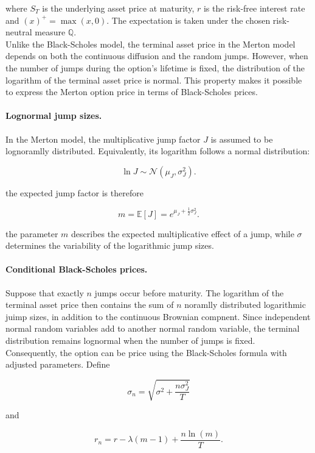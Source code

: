 \documentclass{article}
\begin{document}
	where $S_T$ is the underlying asset price at maturity, $r$ is the risk-free interest rate and $(x)^+ = \max(x, 0)$. The expectation is taken under the chosen risk-neutral measure $\mathbb{Q}$.\\
	Unlike the Black-Scholes model, the terminal asset price in the Merton model depends on both the continuous diffusion and the random jumps. However, when the number of jumps during the option's lifetime is fixed, the distribution of the logarithm of the terminal asset price is normal. This property makes it possible to express the Merton option price in terms of Black-Scholes prices. 
	
	\paragraph{Lognormal jump sizes.}
	
	In the Merton model, the multiplicative jump factor $J$ is assumed to be lognoramlly distributed. Equivalently, its logarithm follows a normal distribution:
	
	\[
	\ln J \sim
	\mathcal{N}(\mu_J,\sigma_J^2).
	\]
	
	the expected jump factor is therefore
	
	\[
	m=\mathbb{E}[J]
	=e^{\mu_J+\frac{1}{2}\sigma_J^2}.
	\]
	
	the parameter $m$ describes the expected multiplicative effect of a jump, while $\sigma$ determines the variability of the logarithmic jump sizes.
	
	\paragraph{Conditional Black-Scholes prices.}
	
	Suppose that exactly $n$ jumps occur before maturity. The logarithm of the terminal asset price then contains the sum of $n$ noramlly distributed logarithmic juimp sizes, in addition to the continuous Brownian compnent. Since independent normal random variables add to another normal random variable, the terminal distribution remains lognormal when the number of jumps is fixed.\\
	Consequently, the option can be price using the Black-Scholes formula with adjusted parameters. Define 
	
	\[
		\sigma_n = \sqrt{\sigma^2+\frac{n\sigma_J^2}{T}}
	\]
	
	and 
	
	\[
		r_n = r-\lambda(m-1)+\frac{n\ln(m)}{T}.
	\]
	
\end{document}
